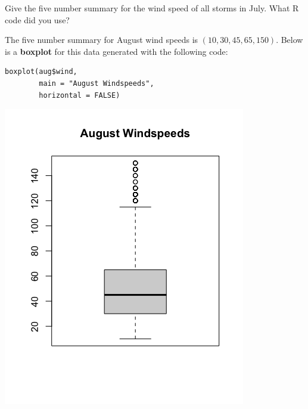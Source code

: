 \bb[resume]
\ii Give the five number summary for the wind speed of all storms in July.  What R code did you use?


\vfill

\ee


The five number summary for August wind speeds is $(10, 30, 45, 65, 150)$. Below is a \textbf{boxplot} for
this data generated with the following code:



\begin{multicols}{2}

\begin{lstlisting}
boxplot(aug$wind, 
        main = "August Windspeeds", 
        horizontal = FALSE)
\end{lstlisting}

\columnbreak

\includegraphics[width=0.45\tw]{02/fig-aug-box.png}

\end{multicols}

